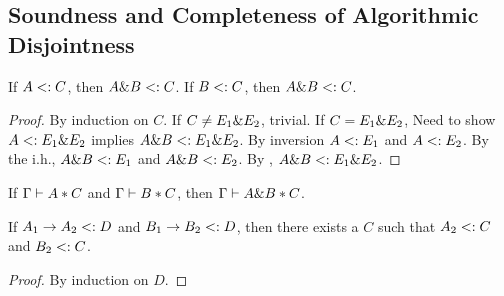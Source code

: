 \subsection{Soundness and Completeness of Algorithmic Disjointness}

\begin{theorem}
  If $A <: C$, then $A \& B <: C$.
  If $B <: C$, then $A \& B <: C$.
\end{theorem}


\begin{proof}
  By induction on $C$.
  If $C \neq E_1 \& E_2$, trivial.
  If $C = E_1 \& E_2$,
  Need to show $A <: E_1 \& E_2$ implies $A \& B <: E_1 \& E_2$.
  By inversion $A <: E_1$ and $A <: E_2$.
  By the i.h., $A \& B <: E_1$ and $A \& B <: E_2$.
  By , $A \& B <: E_1 \& E_2$.
\end{proof}

%
%

\begin{theorem}
  \label{theorem:disjoint-intersect}

  If $\Gamma \vdash A * C$ and $\Gamma \vdash B * C$,
  then $\Gamma \vdash A \& B * C$.
\end{theorem}

\begin{lemma}
  \label{lemma:common-supertype}

  If $A_1 \to A_2 <: D$ and $B_1 \to B_2 <: D$,
  then there exists a $C$ such that $A_2 <: C$ and $B_2 <: C$.
\end{lemma}

\begin{proof}
  By induction on $D$.
\end{proof}

\soundness*


